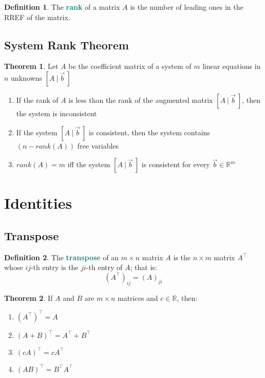 \documentclass[12pt]{article}
\theoremstyle{definition}
\newtheorem*{defn}{Definition}
\newtheorem*{theorem}{Theorem}
\begin{document}
\begin{defn}
  The \textbf{\textcolor{teal}{rank}} of a matrix $A$ is the number of leading ones in the RREF of the matrix.
\end{defn}

\subsection{System Rank Theorem}
\begin{theorem}
  Let $A$ be the coefficient matrix of a system of $m$ linear equations in $n$ unknowns $\left[A ~|~ \vec{b}~\right]$
  \begin{enumerate}
    \item If the rank of $A$ is less than the rank of the augmented matrix $\left[A ~|~ \vec{b}~\right]$, then the system is inconsistent
    \item If the system $\left[A ~|~ \vec{b}~\right]$ is consistent, then the system contains $(n - rank(A))$ free variables
    \item $rank(A) = m$ iff the system $\left[A ~|~ \vec{b}~\right]$ is consistent for every $\vec{b} \in \mathbb{R}^{m}$
  \end{enumerate}
\end{theorem}

\section{Identities}
\subsection{Transpose}
\begin{defn}
  The \textbf{\textcolor{teal}{transpose}} of an $m \times n$ matrix $A$ is the $n \times m$ matrix $A^\intercal$ whose $ij$-th entry is the $ji$-th entry of $A$; that is:
  $$(A^\intercal)_{ij} = (A)_{ji}$$
\end{defn}
\begin{theorem}
  If $A$ and $B$ are $m \times n$ matrices and $c \in \mathbb{R}$, then:
  \begin{enumerate}
    \item $(A^\intercal)^\intercal = A$
    \item $(A + B)^\intercal = A^\intercal + B^\intercal$
    \item $(cA)^\intercal = cA^\intercal$
    \item $(AB)^\intercal = B^\intercal A^\intercal$
  \end{enumerate}
\end{theorem}
\end{document}
